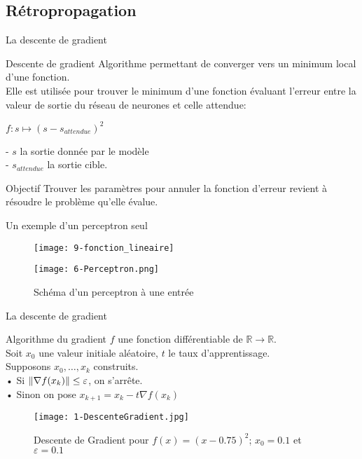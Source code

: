\subsection{Rétropropagation}

\begin{frame}{La descente de gradient}
    \begin{block}{Descente de gradient}
        Algorithme permettant de converger vers un minimum local d'une fonction. \\
        Elle est utilisée pour trouver le minimum d'une fonction évaluant l'erreur entre la valeur de sortie du réseau de neurones et celle attendue: \\
        \begin{center}
            $f : s \mapsto (s - s_{attendue})^2$\\
        \end{center}
        - $s$ la sortie donnée par le modèle \\
        - $s_{attendue}$ la sortie cible. \\

    \end{block}
    \begin{exampleblock}{Objectif}
        Trouver les paramètres pour annuler la fonction d'erreur revient à résoudre le problème qu'elle évalue.
    \end{exampleblock}
\end{frame}


\begin{frame}{Un exemple d'un perceptron seul}
    \begin{figure}
        \centering
        \texttt{[image: 9-fonction\_lineaire]}
    \end{figure}
    \begin{figure}
        \centering
        \texttt{[image: 6-Perceptron.png]}
        \caption{Schéma d'un perceptron à une entrée}
    \end{figure}
\end{frame}


\begin{frame}{La descente de gradient}
    \begin{block}{Algorithme du gradient}
        $f$ une fonction différentiable de $\mathbb{R} \to \mathbb{R}$. \\
        Soit $x_0$ une valeur initiale aléatoire, $t$ le taux d'apprentissage. \\
        Supposons $x_0, \ldots, x_k$ construits. \\
        • Si $\| \nabla f(x_k) \| \leq \varepsilon$, on s'arrête. \\
        • Sinon on pose $x_{k+1} = x_k - t \nabla f(x_k)$ \\
    \end{block}
    \begin{figure}
        \centering
        \texttt{[image: 1-DescenteGradient.jpg]}
        \caption{Descente de Gradient pour $f(x) = (x-0.75)^2$; $x_0=0.1$ et $\varepsilon = 0.1$}
    \end{figure}
\end{frame}


